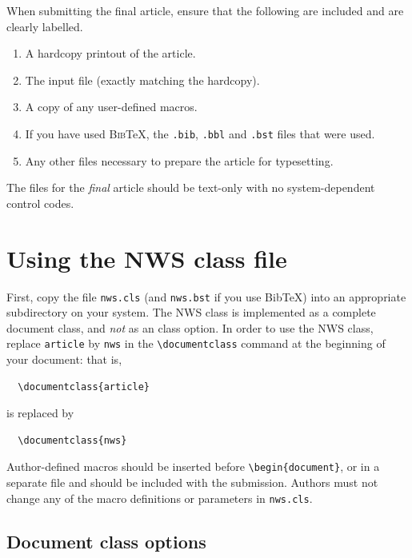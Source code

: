 \documentclass{article}
\begin{document}
When submitting the final article, ensure that  the following are included and
are clearly labelled.
\begin{enumerate}
  \item A hardcopy printout of the article.
  \item The input file (exactly matching the hardcopy).
  \item A copy of any user-defined macros.
  \item If you have used \textsc{Bib}\TeX, the \verb".bib", \verb".bbl"
        and \verb".bst" files that were used.
  \item Any other files necessary to prepare the article for typesetting.
\end{enumerate}
The files for the \emph{final} article should be text-only with no
system-dependent control codes.

\section{Using the NWS class file}
\label{usingjnwsclass}

First, copy the file \verb"nws.cls" (and \verb"nws.bst" if you use Bib\TeX)
into an appropriate subdirectory on your system. The NWS class is implemented
as a complete document class, and \emph{not} as an class option.
In order to use the NWS class, replace \verb"article" by \verb"nws" in the
\verb"\documentclass" command at the beginning of your document: that is,
%
\begin{verbatim}
  \documentclass{article}
\end{verbatim}
%
is replaced by
%
\begin{verbatim}
  \documentclass{nws}
\end{verbatim}
%
Author-defined macros should be inserted before \verb"\begin{document}",
or in a separate file and should be included with the submission.
Authors must not change any of the macro definitions or parameters
in \verb"nws.cls".


\subsection{Document class options}\label{sec:ClassOp}
\end{document}
